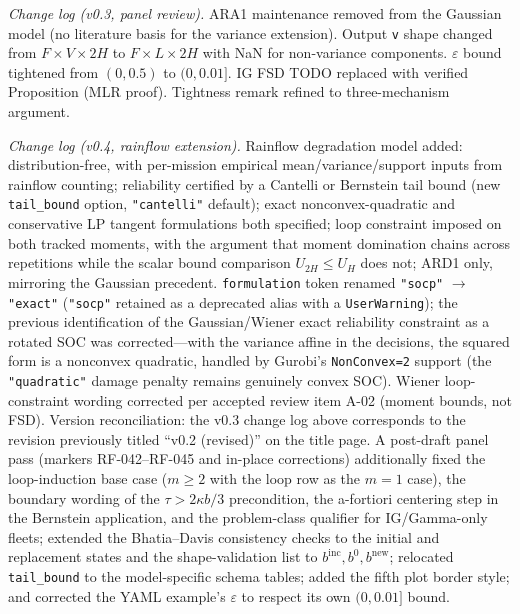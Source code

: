 \emph{Change log (v0.3, panel review).}
ARA1 maintenance removed from the Gaussian model (no literature basis for the
variance extension). Output \texttt{v} shape changed from $F \times V \times 2H$
to $F \times L \times 2H$ with NaN for non-variance components.
$\varepsilon$ bound tightened from $(0, 0.5)$ to $(0, 0.01]$.
IG FSD TODO replaced with verified Proposition (MLR proof).
Tightness remark refined to three-mechanism argument.

\emph{Change log (v0.4, rainflow extension).}
Rainflow degradation model added: distribution-free, with per-mission empirical
mean/variance/support inputs from rainflow counting; reliability certified by a
Cantelli or Bernstein tail bound (new \texttt{tail\_bound} option,
\texttt{"cantelli"} default); exact nonconvex-quadratic and conservative LP
tangent formulations both specified; loop constraint imposed on both tracked
moments, with the argument that moment domination chains across repetitions
while the scalar bound comparison $U_{2H} \leq U_H$ does not; ARD1 only,
mirroring the Gaussian precedent. \texttt{formulation} token renamed
\texttt{"socp"} $\to$ \texttt{"exact"} (\texttt{"socp"} retained as a deprecated
alias with a \texttt{UserWarning}); the previous identification of the
Gaussian/Wiener exact reliability constraint as a rotated SOC was corrected---with
the variance affine in the decisions, the squared form is a nonconvex quadratic,
handled by Gurobi's \texttt{NonConvex=2} support (the \texttt{"quadratic"}
damage penalty remains genuinely convex SOC). Wiener loop-constraint wording
corrected per accepted review item A-02 (moment bounds, not FSD). Version
reconciliation: the v0.3 change log above corresponds to the revision previously
titled ``v0.2 (revised)'' on the title page.
A post-draft panel pass (markers RF-042--RF-045 and in-place corrections)
additionally fixed the loop-induction base case ($m \geq 2$ with
the loop row as the $m=1$ case), the boundary wording of the
$\tau > 2\kappa b/3$ precondition, the a-fortiori centering step in the
Bernstein application, and the problem-class qualifier for IG/Gamma-only
fleets; extended the Bhatia--Davis consistency checks to the initial and
replacement states and the shape-validation list to $b^{\mathrm{inc}}, b^{0},
b^{\mathrm{new}}$; relocated \texttt{tail\_bound} to the model-specific
schema tables; added the fifth plot border style; and corrected the YAML
example's $\varepsilon$ to respect its own $(0, 0.01]$ bound.

